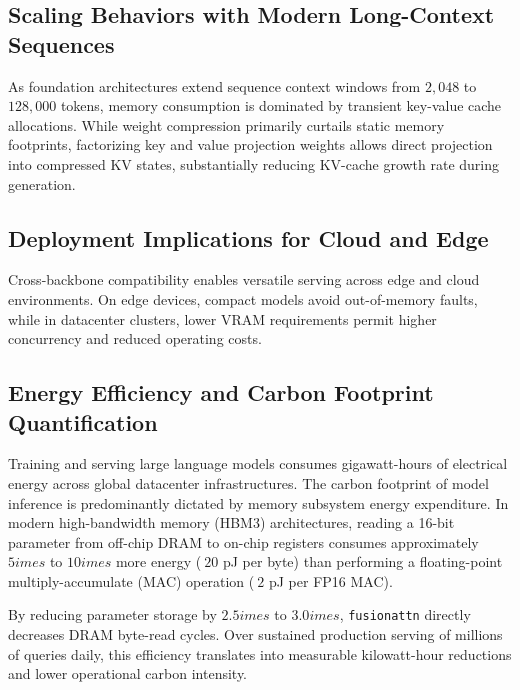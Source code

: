 \subsection{Scaling Behaviors with Modern Long-Context Sequences}
As foundation architectures extend sequence context windows from $2{,}048$ to $128{,}000$ tokens, memory consumption is dominated by transient key-value cache allocations. While weight compression primarily curtails static memory footprints, factorizing key and value projection weights allows direct projection into compressed KV states, substantially reducing KV-cache growth rate during generation.

\subsection{Deployment Implications for Cloud and Edge}
Cross-backbone compatibility enables versatile serving across edge and cloud environments. On edge devices, compact models avoid out-of-memory faults, while in datacenter clusters, lower VRAM requirements permit higher concurrency and reduced operating costs.

\subsection{Energy Efficiency and Carbon Footprint Quantification}
Training and serving large language models consumes gigawatt-hours of electrical energy across global datacenter infrastructures. The carbon footprint of model inference is predominantly dictated by memory subsystem energy expenditure. In modern high-bandwidth memory (HBM3) architectures, reading a 16-bit parameter from off-chip DRAM to on-chip registers consumes approximately $5	imes$ to $10	imes$ more energy ($~20$ pJ per byte) than performing a floating-point multiply-accumulate (MAC) operation ($~2$ pJ per FP16 MAC).

By reducing parameter storage by $2.5	imes$ to $3.0	imes$, \texttt{fusionattn} directly decreases DRAM byte-read cycles. Over sustained production serving of millions of queries daily, this efficiency translates into measurable kilowatt-hour reductions and lower operational carbon intensity.
